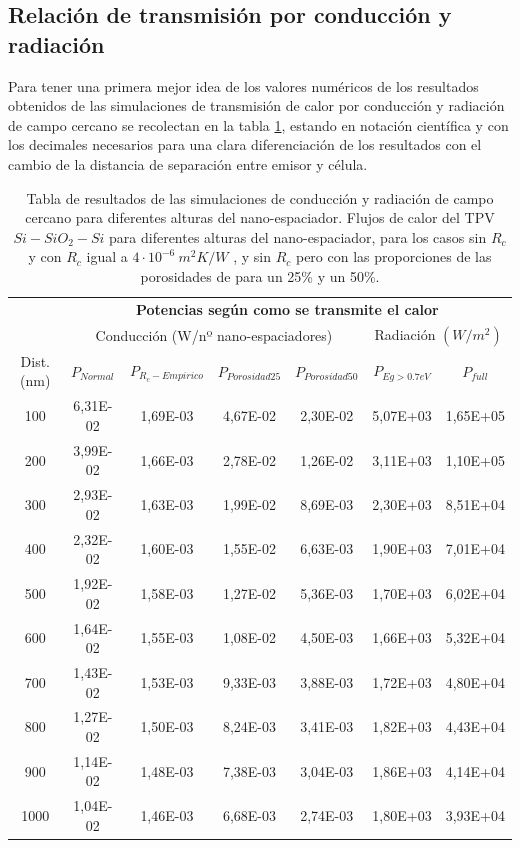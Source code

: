 \subsection{Relación de transmisión por conducción y radiación}
Para tener una primera mejor idea de los valores numéricos de los resultados obtenidos de las simulaciones de transmisión de calor por conducción y radiación de campo cercano se recolectan en la tabla \ref{tab:condTerSiSiO2Si}, estando en notación científica y con los decimales necesarios para una clara diferenciación de los resultados con el cambio de la distancia de separación entre emisor y célula.
\begin{table}[H]
	\centering
		\begin{tabular}{|c||c|c|c|c||c|c|}
		\hline
			\multirow{2}{*}{ }& \multicolumn{6}{c|}{\textbf{\large Potencias según como se transmite el calor}}\\ \cline{2-7}
		  & \multicolumn{4}{c||}{Conducción (W/nº nano-espaciadores)}& \multicolumn{2}{c|}{Radiación $(W/m^2)$}\\ \hline
			Dist. (nm)&$P_{Normal}$&$P_{R_c-Empirico}$&$P_{Porosidad25}$&$P_{Porosidad50}$&$P_{Eg>0.7eV}$&$P_{full}$\\ \hline \hline
			100&6,31E-02&1,69E-03&4,67E-02&2,30E-02&5,07E+03&1,65E+05\\ \hline
			200&3,99E-02&1,66E-03&2,78E-02&1,26E-02&3,11E+03&1,10E+05\\ \hline
			300&2,93E-02&1,63E-03&1,99E-02&8,69E-03&2,30E+03&8,51E+04\\ \hline
			400&2,32E-02&1,60E-03&1,55E-02&6,63E-03&1,90E+03&7,01E+04\\ \hline
			500&1,92E-02&1,58E-03&1,27E-02&5,36E-03&1,70E+03&6,02E+04\\ \hline
			600&1,64E-02&1,55E-03&1,08E-02&4,50E-03&1,66E+03&5,32E+04\\ \hline
			700&1,43E-02&1,53E-03&9,33E-03&3,88E-03&1,72E+03&4,80E+04\\ \hline
			800&1,27E-02&1,50E-03&8,24E-03&3,41E-03&1,82E+03&4,43E+04\\ \hline
			900&1,14E-02&1,48E-03&7,38E-03&3,04E-03&1,86E+03&4,14E+04\\ \hline
			1000&1,04E-02&1,46E-03&6,68E-03&2,74E-03&1,80E+03&3,93E+04\\ \hline
		\end{tabular}
	\caption{Tabla de resultados de las simulaciones de conducción y radiación de campo cercano para diferentes alturas del nano-espaciador. Flujos de calor del TPV $Si-SiO_2-Si$ para diferentes alturas del nano-espaciador, para los casos sin $R_c$ y con $R_c$ igual a $4 \cdot 10^{-6} \ m^2 K/W$ \cite{nf_TPV_Pillars_SiO2}, y sin $R_c$ pero con las proporciones de las porosidades de \cite{ThermalConductivity_SiO2_2018} para un 25\% y un 50\%.}
	\label{tab:condTerSiSiO2Si}
\end{table}
